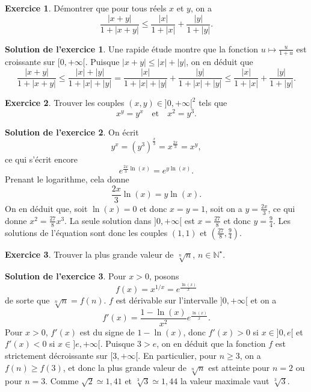 \documentclass[a4paper, 11pt,openany]{article}%
\theoremstyle{plain}
\theoremstyle{definition}
\newtheorem{exo}{Exercice}
\newtheorem{sol}{Solution de l'exercice}
\theoremstyle{remark}
\newcommand{\N}{\mathbb{N}}
\begin{document}
\begin{exo}
 Démontrer que pour tous réels $x$ et $y$, on a
	\[
		\dfrac{|x+y|}{1+|x+y|} \leqslant \dfrac{|x|}{1+|x|} + \dfrac{|y|}{1+|y|} .\]
\end{exo}

\begin{sol}
Une rapide étude montre que la fonction $u \mapsto \frac{u}{1+u}$ est croissante sur $[0,+ \infty[$. Puisque $|x+y|\leqslant |x|+|y|$, on en déduit que 
\[ \frac{|x+y|}{1+|x+y|} \leqslant \frac{|x|+|y|}{1+|x|+|y|}  = \frac{|x|}{1+|x|+|y|} + \frac{|y|}{1+|x|+|y|} \leqslant \frac{|x|}{1+|x|} + \frac{|y|}{1+|y|}.\]
\end{sol}


\begin{exo}
Trouver les couples $(x,y) \in ]0,+\infty[^2$ tels que
\[ x^y = y^x \quad \text{et} \quad x^2 = y^3.\]
\end{exo}

\begin{sol}
On écrit 
\[ y^x=(y^3)^{\frac{x}{3}} = x^{\frac{2x}{3}} =x^y,\]
 ce qui s'écrit encore 
 \[ e^{\frac{2x}{3} \ln(x)} = e^{y \ln(x)}.\]
 Prenant le logarithme, cela donne 
 \[ \frac{2x}{3} \ln (x)= y \ln(x).\]
 On en déduit que, soit $\ln(x)=0$ et donc $x=y=1$, soit on a $y=\frac{2x}{3}$, ce qui donne $x^2=\frac{27}{8} x^3$. La seule solution dans $]0,+\infty[$ est $x=\frac{27}{8}$ et donc $y=\frac{9}{4}$. Les solutions de l'équation sont donc les couples $(1,1)$ et $\left(\frac{27}{8},\frac{9}{4} \right)$.
\end{sol}



\begin{exo}
Trouver la plus grande valeur de $\sqrt[n]{n}$, $n \in \N^{\star}$.
\end{exo}

\begin{sol}
Pour $x>0$, posons 
\[ f(x)=x^{ 1/x} = e^{\frac{\ln(x)}{x}}\]
de sorte que $\sqrt[n]{n}=f(n)$. $f$ est dérivable sur l'intervalle $]0,+\infty[$ et on a 
\[ f'(x)=\frac{1-\ln(x)}{x^2}e^{\frac{\ln(x)}{x}}.\]
Pour $x>0$, $f'(x)$ est du signe de $1-\ln(x)$, donc $f'(x)>0$ si $x \in ]0,e[$ et $f'(x)<0$ si $x\in ]e,+\infty[$. Puisque $3>e$, on en déduit que la fonction $f$ est strictement décroissante sur $[3,+\infty[$. En particulier, pour $n \geqslant 3$, on a $f(n) \geqslant f(3)$, et donc la plus grande valeur de $\sqrt[n]{n}$ est atteinte pour $n=2$ ou pour $n=3$. Comme $\sqrt{2} \simeq 1,41$ et $\sqrt[3]{3} \simeq 1,44$ la valeur maximale vaut $\sqrt[3]{3}$.
\end{sol}
\end{document}

